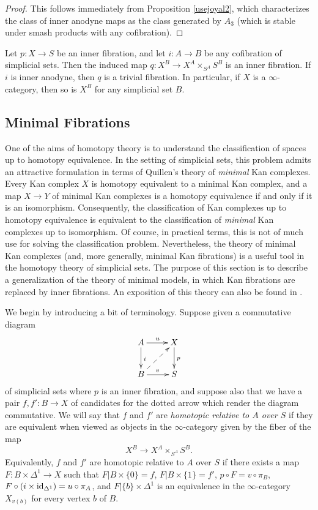 \begin{proof}
This follows immediately from Proposition \ref{usejoyal2}, which characterizes the class of inner anodyne maps as the class generated by $A_3$ (which is stable under smash products with any cofibration).
\end{proof}

\begin{corollary}
Let $p: X \rightarrow S$ be an inner fibration, and let $i: A \rightarrow B$ be any cofibration of simplicial sets. Then the induced map $q: X^{B} \rightarrow X^A \times_{ S^A } S^B$ is an inner fibration. If $i$ is inner anodyne, then $q$ is a trivial fibration. In particular, if $X$ is a $\infty$-category, then so is $X^B$ for any simplicial set $B$.
\end{corollary}

\subsection{Minimal Fibrations}\label{minin}

One of the aims of homotopy theory is to understand the classification of spaces up to 
homotopy equivalence. In the setting of simplicial sets, this problem admits an attractive formulation in terms of Quillen's theory of {\em minimal} Kan complexes.
Every Kan complex $X$ is homotopy equivalent to a minimal Kan complex, and a map $X \rightarrow Y$ of minimal Kan complexes is a homotopy equivalence if and only if it is an isomorphism. Consequently, the classification of Kan complexes up to homotopy equivalence is equivalent to the classification of {\em minimal} Kan complexes up to isomorphism. Of course, in practical terms, this is not of much use for solving the classification problem. Nevertheless, the theory of minimal Kan complexes (and, more generally, minimal Kan fibrations) is a useful tool in the homotopy theory of simplicial sets. The purpose of this section is to describe a generalization of the theory of minimal models, in which Kan fibrations are replaced by inner fibrations. An exposition of this theory can also be found in \cite{joyalnotpub}.

We begin by introducing a bit of terminology. Suppose given a commutative diagram
$$ \xymatrix{ A \ar[d]^{i} \ar[r]^{u} & X \ar[d]^{p} \\
B \ar[r]^{v} \ar@{-->}[ur] & S }$$
of simplicial sets where $p$ is an inner fibration, and suppose also that we have a pair $f,f': B \rightarrow X$ of candidates for the dotted arrow which render the diagram commutative. We will say that $f$ and $f'$ are {\it homotopic relative to $A$ over $S$}
if they are equivalent when viewed as objects in the $\infty$-category given by
the fiber of the map
$$ X^B \rightarrow X^A \times_{ S^A} S^B.$$
Equivalently, $f$ and $f'$ are homotopic relative to $A$ over $S$ if
there exists a map $F: B \times \Delta^1 \rightarrow X$ such that
$F | B \times \{0\} = f$, $F | B \times \{1\} = f'$, $p \circ F = v \circ \pi_{B}$,
$F \circ (i \times \operatorname{id}_{\Delta^1}) = u \circ \pi_{A}$, and $F| \{b\} \times \Delta^1$
is an equivalence in the $\infty$-category $X_{v(b)}$ for every vertex $b$ of $B$.

